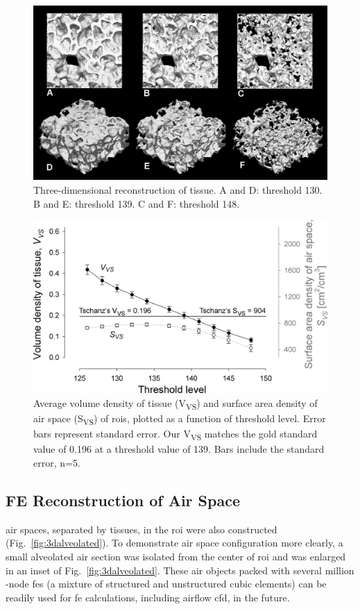 \begin{figure}[htb]
	\centering
	\includegraphics[width=\imsize]{img/Tsuda2008/Tsuda-07}
	\caption[Three-dimensional reconstruction of tissue]{Three-dimensional reconstruction of tissue. A and D: threshold 130. B and E: threshold 139. C and F: threshold 148.}
	\label{fig:3dreconstruction}
\end{figure}

\begin{figure}[htb]
	\centering
	\includegraphics[width=\imsize]{img/Tsuda2008/Tsuda-08}
	\caption[Average volume density of tissue and surface area density of air space]{Average volume density of tissue (V\textsubscript{VS}) and surface area density of air space (S\textsubscript{VS}) of \acp{roi}, plotted as a function of threshold level. Error bars represent standard error. Our V\textsubscript{VS} matches the gold standard value of 0.196 at a threshold value of 139. Bars include the standard error, n=5.}
	\label{fig:VVSplot}
\end{figure}

\subsection{FE \threed Reconstruction of Air Space}
\threed air spaces, separated by tissues, in the \ac{roi} were also constructed (Fig.~\ref{fig:3dalveolated}). To demonstrate air space configuration more clearly, a small alveolated air section was isolated from the center of \ac{roi} and was enlarged in an inset of Fig.~\ref{fig:3dalveolated}. These \threed air objects packed with several million -node \acp{fe} (a mixture of structured and unstructured cubic elements) can be readily used for \ac{fe} calculations, including airflow \ac{cfd}, in the future.

